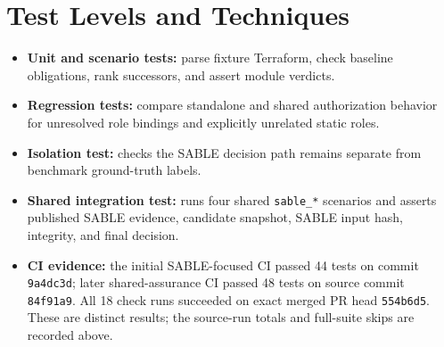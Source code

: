 \section{Test Levels and Techniques}
\begin{itemize}
    \item \textbf{Unit and scenario tests:} parse fixture Terraform, check baseline obligations, rank successors, and assert module verdicts.
    \item \textbf{Regression tests:} compare standalone and shared authorization behavior for unresolved role bindings and explicitly unrelated static roles.
    \item \textbf{Isolation test:} checks the SABLE decision path remains separate from benchmark ground-truth labels.
    \item \textbf{Shared integration test:} runs four shared \texttt{sable\_*} scenarios and asserts published SABLE evidence, candidate snapshot, SABLE input hash, integrity, and final decision.
    \item \textbf{CI evidence:} the initial SABLE-focused CI passed 44 tests on commit \texttt{9a4dc3d}; later shared-assurance CI passed 48 tests on source commit \texttt{84f91a9}. All 18 check runs succeeded on exact merged PR head \texttt{554b6d5}. These are distinct results; the source-run totals and full-suite skips are recorded above.
\end{itemize}

